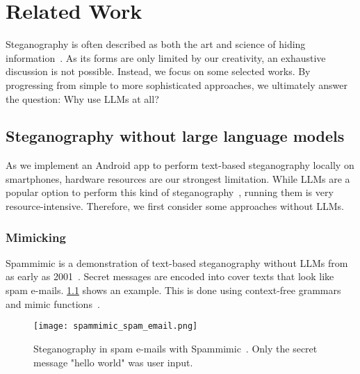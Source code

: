 
\chapter{Related Work}\label{ch:relatedwork}
\glsresetall %

Steganography is often described as both the art and science of hiding information~\cite{bennettLinguisticSteganographySurvey2004}. As its forms are only limited by our creativity, an exhaustive discussion is not possible. Instead, we focus on some selected works. By progressing from simple to more sophisticated approaches, we ultimately answer the question: Why use \glspl{LLM} at all?

\section{Steganography without large language models}
\label{sec:steganographyWithoutLLMs}
As we implement an Android app to perform text-based steganography locally on smartphones, hardware resources are our strongest limitation. While \glspl{LLM} are a popular option to perform this kind of steganography~\cite{zieglerNeuralLinguisticSteganography2019}, running them is very resource-intensive. Therefore, we first consider some approaches without \glspl{LLM}.

\subsection{Mimicking}
\label{sec:mimicking}
Spammimic is a demonstration of text-based steganography without \glspl{LLM} from as early as 2001~\cite{spammimicSpammimic2000}. Secret messages are encoded into cover texts that look like spam e-mails. \cref{fig:spammimicSpamEmail} shows an example. This is done using context-free grammars and mimic functions~\cite{waynerMimicFunctions1992,bennettLinguisticSteganographySurvey2004}.

\begin{figure}
    \begin{wide}
        \centering
        \captionsetup{width=\linewidth}
        \texttt{[image: spammimic\_spam\_email.png]}
        \caption[Spammimic]{Steganography in spam e-mails with Spammimic~\cite{spammimicSpammimic2000}. Only the secret message "hello world" was user input.}
        \label{fig:spammimicSpamEmail}
    \end{wide}
\end{figure}

